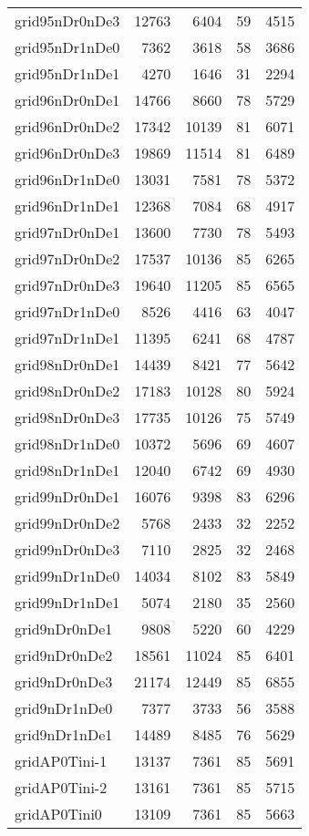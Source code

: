 \begin{longtable}{lrrrr}
grid95nDr0nDe3 & 12763 & 6404 & 59 & 4515 \\
grid95nDr1nDe0 & 7362 & 3618 & 58 & 3686 \\
grid95nDr1nDe1 & 4270 & 1646 & 31 & 2294 \\
grid96nDr0nDe1 & 14766 & 8660 & 78 & 5729 \\
grid96nDr0nDe2 & 17342 & 10139 & 81 & 6071 \\
grid96nDr0nDe3 & 19869 & 11514 & 81 & 6489 \\
grid96nDr1nDe0 & 13031 & 7581 & 78 & 5372 \\
grid96nDr1nDe1 & 12368 & 7084 & 68 & 4917 \\
grid97nDr0nDe1 & 13600 & 7730 & 78 & 5493 \\
grid97nDr0nDe2 & 17537 & 10136 & 85 & 6265 \\
grid97nDr0nDe3 & 19640 & 11205 & 85 & 6565 \\
grid97nDr1nDe0 & 8526 & 4416 & 63 & 4047 \\
grid97nDr1nDe1 & 11395 & 6241 & 68 & 4787 \\
grid98nDr0nDe1 & 14439 & 8421 & 77 & 5642 \\
grid98nDr0nDe2 & 17183 & 10128 & 80 & 5924 \\
grid98nDr0nDe3 & 17735 & 10126 & 75 & 5749 \\
grid98nDr1nDe0 & 10372 & 5696 & 69 & 4607 \\
grid98nDr1nDe1 & 12040 & 6742 & 69 & 4930 \\
grid99nDr0nDe1 & 16076 & 9398 & 83 & 6296 \\
grid99nDr0nDe2 & 5768 & 2433 & 32 & 2252 \\
grid99nDr0nDe3 & 7110 & 2825 & 32 & 2468 \\
grid99nDr1nDe0 & 14034 & 8102 & 83 & 5849 \\
grid99nDr1nDe1 & 5074 & 2180 & 35 & 2560 \\
grid9nDr0nDe1 & 9808 & 5220 & 60 & 4229 \\
grid9nDr0nDe2 & 18561 & 11024 & 85 & 6401 \\
grid9nDr0nDe3 & 21174 & 12449 & 85 & 6855 \\
grid9nDr1nDe0 & 7377 & 3733 & 56 & 3588 \\
grid9nDr1nDe1 & 14489 & 8485 & 76 & 5629 \\
gridAP0Tini-1 & 13137 & 7361 & 85 & 5691 \\
gridAP0Tini-2 & 13161 & 7361 & 85 & 5715 \\
gridAP0Tini0 & 13109 & 7361 & 85 & 5663 \\

\end{longtable}
